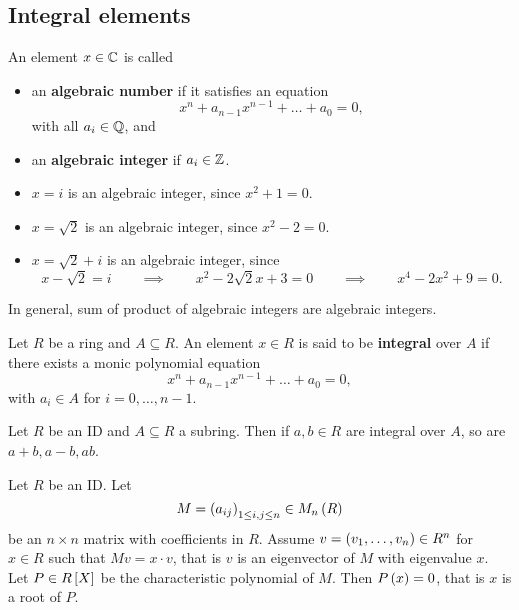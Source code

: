 \pagebreak

\subsection{Integral elements}

\begin{definition}
An element $ x \in \C $ is called
\begin{itemize}
\item an \textbf{algebraic number} if it satisfies an equation
$$ x^n + a_{n - 1}x^{n - 1} + \dots + a_0 = 0, $$
with all $ a_i \in \Q $, and
\item an \textbf{algebraic integer} if $ a_i \in \Z $.
\end{itemize}
\end{definition}

\begin{example*}
\hfill
\begin{itemize}
\item $ x = i $ is an algebraic integer, since $ x^2 + 1 = 0 $.
\item $ x = \sqrt{2} $ is an algebraic integer, since $ x^2 - 2 = 0 $.
\item $ x = \sqrt{2} + i $ is an algebraic integer, since
$$ x - \sqrt{2} = i \qquad \implies \qquad x^2 - 2\sqrt{2}x + 3 = 0 \qquad \implies \qquad x^4 - 2x^2 + 9 = 0. $$
\end{itemize}
\end{example*}

In general, sum of product of algebraic integers are algebraic integers.

\begin{definition}
Let $ R $ be a ring and $ A \subseteq R $. An element $ x \in R $ is said to be \textbf{integral} over $ A $ if there exists a monic polynomial equation
$$ x^n + a_{n - 1}x^{n - 1} + \dots + a_0 = 0, $$
with $ a_i \in A $ for $ i = 0, \dots, n - 1 $.
\end{definition}

\begin{theorem}
\label{thm:integralsubring}
Let $ R $ be an ID and $ A \subseteq R $ a subring. Then if $ a, b \in R $ are integral over $ A $, so are $ a + b, a - b, ab $.
\end{theorem}

\begin{lemma}
\label{lem:cayleyhamilton}
Let $ R $ be an ID. Let
$$ M = \rb{a_{ij}}_{1 \le i, j \le n} \in M_n\rb{R} $$
be an $ n \times n $ matrix with coefficients in $ R $. Assume $ v = \rb{v_1, \dots, v_n} \in R^n $ for $ x \in R $ such that $ Mv = x \cdot v $, that is $ v $ is an eigenvector of $ M $ with eigenvalue $ x $. Let $ P \in R\sb{X} $ be the characteristic polynomial of $ M $. Then $ P\rb{x} = 0 $, that is $ x $ is a root of $ P $.
\end{lemma}

